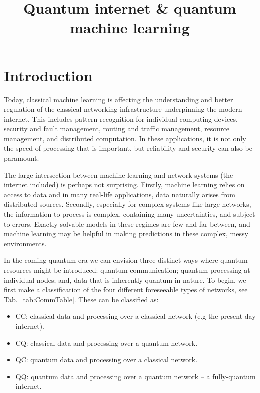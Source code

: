 \documentclass[twocolumn, aps, rmp, amsmath, amssymb, nofootinbib, superscriptaddress, longbibliography, floatfix, table-of-contents, eqsecnum]{revtex4}
\title{Quantum internet \& quantum machine learning}
\begin{document}
\maketitle

\tableofcontents 

\section{Introduction}

Today, classical machine learning is affecting the understanding and better regulation of the classical networking infrastructure underpinning the modern internet. This includes pattern recognition for individual computing devices, security and fault management, routing and traffic management, resource management, and distributed computation. In these applications, it is not only the speed of processing that is important, but reliability and security can also be paramount.

The large intersection between machine learning and network systems (the internet included) is perhaps not surprising. Firstly, machine learning relies on access to data and in many real-life applications, data naturally arises from distributed sources. Secondly, especially for complex systems like large networks, the information to process is complex, containing many uncertainties, and subject to errors. Exactly solvable models in these regimes are few and far between, and machine learning may be helpful in making predictions in these complex, messy environments.

In the coming quantum era we can envision three distinct ways where quantum resources might be introduced: quantum communication; quantum processing at individual nodes; and, data that is inherently quantum in nature. To begin, we first make a classification of the four different foreseeable types of networks, see Tab.~\ref{tab:CommTable}. These can be classified as:

\begin{itemize}
\item CC: classical data and processing over a classical network (e.g the present-day internet).
\item CQ: classical data and processing over a quantum network.
\item QC: quantum data and processing over a classical network.
\item QQ: quantum data and processing over a quantum network -- a fully-quantum internet.
\end{itemize}
\end{document}
